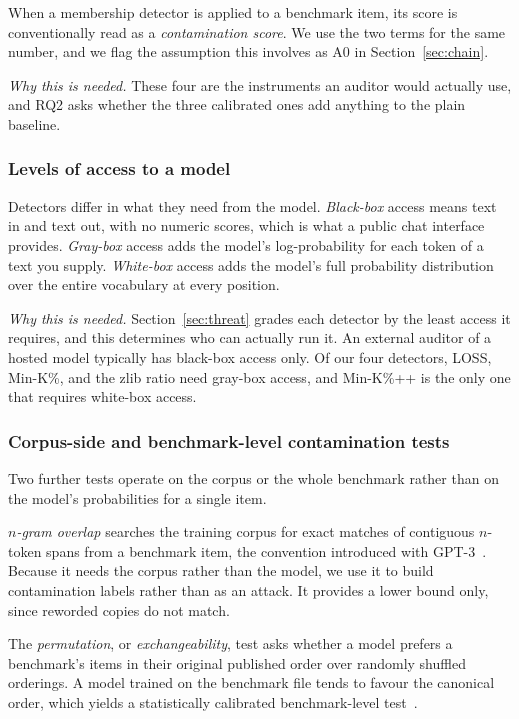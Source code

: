 When a membership detector is applied to a benchmark item, its score is conventionally
read as a \emph{contamination score}. We use the two terms for the same number, and we
flag the assumption this involves as A0 in Section~\ref{sec:chain}.

\emph{Why this is needed.} These four are the instruments an auditor would actually use,
and RQ2 asks whether the three calibrated ones add anything to the plain baseline.

\subsubsection{Levels of access to a model}
Detectors differ in what they need from the model. \emph{Black-box} access means text in
and text out, with no numeric scores, which is what a public chat interface provides.
\emph{Gray-box} access adds the model's log-probability for each token of a text you
supply. \emph{White-box} access adds the model's full probability distribution over the
entire vocabulary at every position.

\emph{Why this is needed.} Section~\ref{sec:threat} grades each detector by the least
access it requires, and this determines who can actually run it. An external auditor of a
hosted model typically has black-box access only. Of our four detectors, LOSS, Min-K\%,
and the zlib ratio need gray-box access, and Min-K\%++ is the only one that requires
white-box access.

\subsubsection{Corpus-side and benchmark-level contamination tests}
Two further tests operate on the corpus or the whole benchmark rather than on the model's
probabilities for a single item.

\emph{$n$-gram overlap} searches the training corpus for exact matches of contiguous
$n$-token spans from a benchmark item, the convention introduced with
GPT-3~\citep{brown2020gpt3}. Because it needs the corpus rather than the model, we use it
to build contamination labels rather than as an attack. It provides a lower bound only,
since reworded copies do not match.

The \emph{permutation}, or \emph{exchangeability}, test asks whether a model prefers a
benchmark's items in their original published order over randomly shuffled orderings. A
model trained on the benchmark file tends to favour the canonical order, which yields a
statistically calibrated benchmark-level test~\citep{oren2024proving}.

